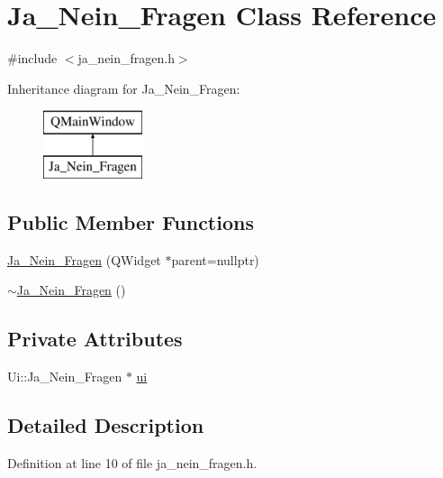\hypertarget{class_ja___nein___fragen}{}\section{Ja\+\_\+\+Nein\+\_\+\+Fragen Class Reference}
\label{class_ja___nein___fragen}


{\ttfamily \#include $<$ja\+\_\+nein\+\_\+fragen.\+h$>$}

Inheritance diagram for Ja\+\_\+\+Nein\+\_\+\+Fragen\+:\begin{figure}[H]
\begin{center}
\leavevmode
\includegraphics[height=2.000000cm]{class_ja___nein___fragen}
\end{center}
\end{figure}
\subsection*{Public Member Functions}
\begin{DoxyCompactItemize}
\item 
\mbox{\hyperlink{class_ja___nein___fragen_a2a2ae998b3b20083aa5ffbb3437a86f0}{Ja\+\_\+\+Nein\+\_\+\+Fragen}} (Q\+Widget $\ast$parent=nullptr)
\item 
\mbox{\hyperlink{class_ja___nein___fragen_afd95c90bae54f7632d74864f22cdaacc}{$\sim$\+Ja\+\_\+\+Nein\+\_\+\+Fragen}} ()
\end{DoxyCompactItemize}
\subsection*{Private Attributes}
\begin{DoxyCompactItemize}
\item 
Ui\+::\+Ja\+\_\+\+Nein\+\_\+\+Fragen $\ast$ \mbox{\hyperlink{class_ja___nein___fragen_a58aeb9b3bcc790da27ef61440e7ec901}{ui}}
\end{DoxyCompactItemize}


\subsection{Detailed Description}


Definition at line 10 of file ja\+\_\+nein\+\_\+fragen.\+h.



